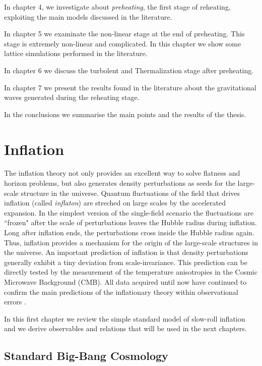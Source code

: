\documentclass[11pt,a4paper,twoside]{book}
\begin{document}
In  chapter 4, we investigate about \textit{preheating}, the first stage of reheating, exploiting the main models discussed in the literature. 

In  chapter 5 we examinate the non-linear stage at the end of preheating. This stage is extremely non-linear and complicated. In this chapter we show some lattice simulations performed in the literature.

In  chapter 6 we discuss the turbolent  and Thermalization stage after preheating.

In chapter 7 we present the results found in the literature about the gravitational waves generated during the reheating stage. 

In the conclusions we summarise the main points and the results of the thesis.

 
 \mainmatter
 
\chapter{Inflation}

The inflation theory not only provides an excellent way to solve flatness and horizon problems, but also generates density perturbations as seeds for the large-scale structure in the universe. Quantum fluctuations of the field that drives inflation (called \textit{inflaton}) are streched on large scales by the accelerated expansion. In the simplest version of the single-field scenario the fluctuations are \textquotedblleft frozen" after the scale of perturbations leaves the Hubble radius during inflation. Long after inflation ends, the perturbations cross inside the Hubble radius again. Thus, inflation provides a mechanism for the origin of the large-scale structures in the universe. An important prediction of inflation is that density perturbations generally exhibit a tiny deviation from scale-invariance. This prediction can be directly tested by the measurement of the temperature anisotropies in the Cosmic Microwave Background (CMB). All data acquired until now have continued to confirm the main predictions of the inflationary theory within observational errors \cite{InflationDynamicsAndReheating:chap1}.

In this first chapter we review the simple standard model of slow-roll inflation and we derive observables and relations that will be used in the next chapters.

\section{Standard Big-Bang Cosmology}
\end{document}

